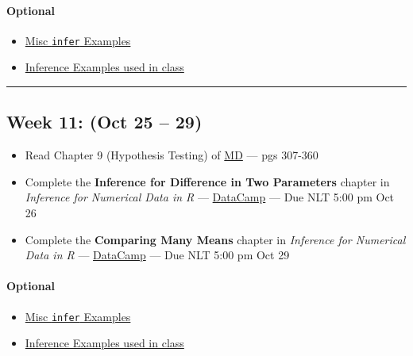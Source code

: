 \documentclass[
]{article}
\begin{document}
\begin{rmdoptional}
\hypertarget{optional}{%
\paragraph*{Optional}\label{optional}}

\begin{itemize}
\item
  \href{../Rmarkdown/ExamplesInfer.html}{Misc \texttt{infer} Examples}
\item
  \href{../Handouts/InferenceExamples.pdf}{Inference Examples used in
  class}
\end{itemize}
\end{rmdoptional}

\begin{center}\rule{0.5\linewidth}{0.5pt}\end{center}

\hypertarget{week-11-oct-25-29}{%
\subsection*{Week 11: (Oct 25 -- 29)}\label{week-11-oct-25-29}}

\begin{itemize}
\item
  Read Chapter 9 (Hypothesis Testing) of
  \href{https://moderndive.com}{MD} --- pgs 307-360
\item
  Complete the \textbf{Inference for Difference in Two Parameters}
  chapter in \emph{Inference for Numerical Data in R} ---
  \href{https://app.datacamp.com/groups/stt3850-fall2021/assignments}{DataCamp}
  --- Due NLT 5:00 pm Oct 26
\item
  Complete the \textbf{Comparing Many Means} chapter in \emph{Inference
  for Numerical Data in R} ---
  \href{https://app.datacamp.com/groups/stt3850-fall2021/assignments}{DataCamp}
  --- Due NLT 5:00 pm Oct 29
\end{itemize}

\begin{rmdoptional}
\hypertarget{optional}{%
\paragraph*{Optional}\label{optional}}

\begin{itemize}
\item
  \href{../Rmarkdown/ExamplesInfer.html}{Misc \texttt{infer} Examples}
\item
  \href{../Handouts/InferenceExamples.pdf}{Inference Examples used in
  class}
\end{itemize}
\end{rmdoptional}
\end{document}
